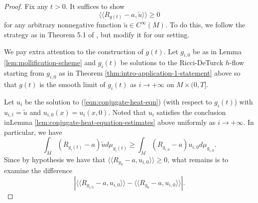 \documentclass[12pt]{amsart}
\theoremstyle{plain}
\theoremstyle{plain}
\theoremstyle{definition}
\theoremstyle{remark}
\numberwithin{equation}{subsection}
\begin{document}
\begin{proof}
Fix any $t>0$. It suffices to show
    \begin{equation*}
        \langle    \langle  R_{g(t)}-a, \tilde u \rangle \rangle \geq 0
    \end{equation*}
    for any arbitrary nonnegative function $\tilde{u}\in C^\infty(M)$. To do this, we follow the strategy as in Theorem 5.1 of \cite{jiang_weak_2021}, but modify it for our setting. 
    
We pay extra attention to the construction of $g(t)$.  Let $g_{i,0}$ be as in Lemma \ref{lem:mollification-scheme} and $g_i(t)$ be solutions to the Ricci-DeTurck $h$-flow starting from $g_{i,0}$ as in Theorem \ref{thm:intro-application-1-statement} above so that $g(t)$ is the smooth limit of $g_i(t)$ as $i\to+\infty$ on $M\times (0,T]$.


Let $u_i$ be the solution to (\ref{eqn:conjugate-heat-eqn}) (with respect to $g_i(t)$) with $u_{i,t} = \tilde{u}$ and $u_{i,0}(x) = u_i(x,0)$. Noted that $u_i$ satisfies the conclusion inLemma \ref{lem:conjugate-heat-equation-estimates} above uniformly as $i\to+\infty$. In particular, we have
    \begin{equation}\label{eqn:scalar-monotonicity}
        \int_M (R_{g_i(t)}-a)\tilde{u}d\mu_{g_i(t)} \geq \int_M (R_{g_{i,0}}-a)u_{i,0}d\mu_{g_{i,0}}.
    \end{equation}
    Since by hypothesis we have that $\langle\langle R_{g_0} - a,u_{i,0}\rangle\rangle \geq 0$, what remains is to examine the difference
    \begin{equation*}
        \left|\langle \langle R_{g_{i,0}}-a, u_{i,0}\rangle \rangle - \langle\langle R_{g_0} - a, u_{i,0}\rangle\rangle \right|.
    \end{equation*}


\end{proof}
\end{document}
